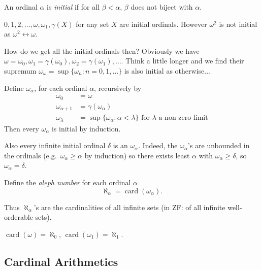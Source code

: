 \documentclass[a4paper]{article}
\DeclareMathOperator{\card}{card}
\newcommand*{\biject}{\leftrightarrow}
\begin{document}
\begin{definition}
  An ordinal \(\alpha\) is \emph{initial} if for all \(\beta < \alpha\), \(\beta\) does not biject with \(\alpha\).
\end{definition}

\begin{eg}
  \(0, 1, 2, \dots, \omega, \omega_1, \gamma(X)\) for any set \(X\) are initial ordinals. However \(\omega^2\) is not initial as \(\omega^2 \biject \omega\).
\end{eg}

How do we get all the initial ordinals then? Obviously we have \(\omega = \omega_0, \omega_1 = \gamma(\omega_0), \omega_2 = \gamma(\omega_1), \dots\). Think a little longer and we find their supremum \(\omega_\omega = \sup \{\omega_n: n = 0, 1, \dots\}\) is also initial as otherwise...

Define \(\omega_\alpha\), for each ordinal \(\alpha\), recursively by
\begin{align*}
  \omega_0 &= \omega \\
  \omega_{\alpha + 1} &= \gamma(\omega_\alpha) \\
  \omega_\lambda &= \sup \{\omega_\alpha: \alpha < \lambda\} \text{ for \(\lambda\) a non-zero limit}
\end{align*}
Then every \(\omega_\alpha\) is initial by induction.

Also every infinite initial ordinal \(\delta\) is an \(\omega_\alpha\). Indeed, the \(\omega_\alpha\)'s are unbounded in the ordinals (e.g.\ \(\omega_\alpha \geq \alpha\) by induction) so there exists least \(\alpha\) with \(\omega_\alpha \geq \delta\), so \(\omega_\alpha = \delta\).

\begin{definition}\index{\(\aleph_\alpha\)}
  Define the \emph{aleph number} for each ordinal \(\alpha\)
  \[
    \aleph_\alpha = \card(\omega_\alpha).
  \]
\end{definition}

Thus \(\aleph_\alpha\)'s are the cardinalities of all infinite sets (in ZF: of all infinite well-orderable sets).

\begin{eg}
  \(\card(\omega) = \aleph_0\), \(\card(\omega_1) = \aleph_1\).
\end{eg}

\subsection{Cardinal Arithmetics}
\end{document}
